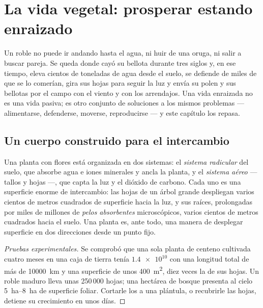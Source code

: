 \chapter{La vida vegetal: prosperar estando enraizado}\label{ch:g12:plant-rooted-life}

Un roble no puede ir andando hasta el agua, ni huir de una oruga, ni
salir a buscar pareja. Se queda donde cayó su bellota durante tres
siglos y, en ese tiempo, eleva cientos de toneladas de agua desde el
suelo, se defiende de miles de  que se lo comerían, gira sus
hojas para seguir la luz y envía su polen y sus bellotas por el campo
con el viento y con los arrendajos. Una vida enraizada no es una vida
pasiva; es otro conjunto de soluciones a los mismos problemas ---
alimentarse, defenderse, moverse, reproducirse --- y este capítulo los
repasa.

\section{Un cuerpo construido para el intercambio}

\begin{proposition}\label{prop:g12:plant-rooted-life:surfaces}
Una planta con flores está organizada en dos sistemas: el
\emph{sistema radicular} del suelo, que absorbe agua e iones minerales
y ancla la planta, y el \emph{sistema aéreo} --- tallos y hojas ---,
que capta la luz y el dióxido de carbono. Cada uno es una superficie
enorme de intercambio: las hojas de un árbol grande despliegan varios
cientos de metros cuadrados de superficie hacia la luz, y sus raíces,
prolongadas por miles de millones de \emph{pelos
absorbentes} microscópicos, varios cientos de
metros cuadrados hacia el suelo. Una planta es, ante todo, una manera
de desplegar superficie en dos direcciones desde un punto fijo.
\end{proposition}
\begin{proof}[Pruebas experimentales]
Se comprobó que una sola planta de centeno cultivada cuatro meses en
una caja de tierra tenía $\num{1.4e10}$  con una
longitud total de más de \qty{10000}{km} y una superficie de unos
\qty{400}{m^2}, diez veces la de sus hojas. Un roble maduro lleva unas
250\,000 hojas; una hectárea de bosque presenta al cielo
\qtyrange{5}{8}{ha} de superficie foliar. Cortarle los  a una plántula, o recubrirle las hojas, detiene su
crecimiento en unos días.
\end{proof}


